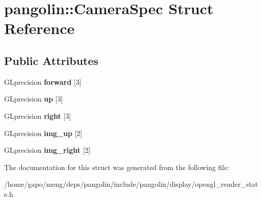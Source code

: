 \hypertarget{structpangolin_1_1_camera_spec}{}\section{pangolin\+:\+:Camera\+Spec Struct Reference}
\label{structpangolin_1_1_camera_spec}
\subsection*{Public Attributes}
\begin{DoxyCompactItemize}
\item 
G\+Lprecision {\bfseries forward} \mbox{[}3\mbox{]}\hypertarget{structpangolin_1_1_camera_spec_a6d79c60d254b53737d3485c3a85b76ef}{}\label{structpangolin_1_1_camera_spec_a6d79c60d254b53737d3485c3a85b76ef}

\item 
G\+Lprecision {\bfseries up} \mbox{[}3\mbox{]}\hypertarget{structpangolin_1_1_camera_spec_a6950692c29299f9aae736c6f75588e62}{}\label{structpangolin_1_1_camera_spec_a6950692c29299f9aae736c6f75588e62}

\item 
G\+Lprecision {\bfseries right} \mbox{[}3\mbox{]}\hypertarget{structpangolin_1_1_camera_spec_a8bc5725f8d8d940f71d661afc6638348}{}\label{structpangolin_1_1_camera_spec_a8bc5725f8d8d940f71d661afc6638348}

\item 
G\+Lprecision {\bfseries img\+\_\+up} \mbox{[}2\mbox{]}\hypertarget{structpangolin_1_1_camera_spec_ac131e80b3ee4e7af9bd166cf970b8fbc}{}\label{structpangolin_1_1_camera_spec_ac131e80b3ee4e7af9bd166cf970b8fbc}

\item 
G\+Lprecision {\bfseries img\+\_\+right} \mbox{[}2\mbox{]}\hypertarget{structpangolin_1_1_camera_spec_abb578352f1f5e3a603dbd8229b002c68}{}\label{structpangolin_1_1_camera_spec_abb578352f1f5e3a603dbd8229b002c68}

\end{DoxyCompactItemize}


The documentation for this struct was generated from the following file\+:\begin{DoxyCompactItemize}
\item 
/home/gapo/meng/deps/pangolin/include/pangolin/display/opengl\+\_\+render\+\_\+state.\+h\end{DoxyCompactItemize}
